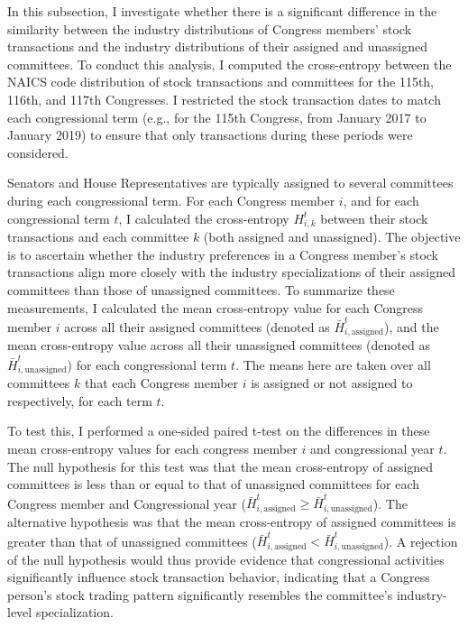 \documentclass[15pt,letterpaper]{article}
\begin{document}
In this subsection, I investigate whether there is a significant difference in the similarity between the industry distributions of Congress members' stock transactions and the industry distributions of their assigned and unassigned committees. 
To conduct this analysis, I computed the cross-entropy between the NAICS code distribution of stock transactions and committees for the 115th, 116th, and 117th Congresses. I restricted the stock transaction dates to match each congressional term (e.g., for the 115th Congress, from January 2017 to January 2019) to ensure that only transactions during these periods were considered.

Senators and House Representatives are typically assigned to several committees during each congressional term. For each Congress member $i$, and for each congressional term $t$, I calculated the cross-entropy $H_{i, k}^t$ between their stock transactions and each committee $k$ (both assigned and unassigned). The objective is to ascertain whether the industry preferences in a Congress member's stock transactions align more closely with the industry specializations of their assigned committees than those of unassigned committees.
To summarize these measurements, I calculated the mean cross-entropy value for each Congress member $i$ across all their assigned committees (denoted as $\bar{H}_{i, \text{assigned}}^t$), and the mean cross-entropy value across all their unassigned committees (denoted as $\bar{H}_{i, \text{unassigned}}^t$) for each congressional term $t$. The means here are taken over all committees $k$ that each Congress member $i$ is assigned or not assigned to respectively, for each term $t$.

To test this, I performed a one-sided paired t-test on the differences in these mean cross-entropy values for each congress member $i$ and congressional year $t$. The null hypothesis for this test was that the mean cross-entropy of assigned committees is less than or equal to that of unassigned committees for each Congress member and Congressional year ($\bar{H}_{i, \text{assigned}}^t \ge \bar{H}_{i, \text{unassigned}}^t$). The alternative hypothesis was that the mean cross-entropy of assigned committees is greater than that of unassigned committees ($\bar{H}_{i, \text{assigned}}^t < \bar{H}_{i, \text{unassigned}}^t$). A rejection of the null hypothesis would thus provide evidence that congressional activities significantly influence stock transaction behavior, indicating that a Congress person's stock trading pattern significantly resembles the committee's industry-level specialization.
\end{document}
